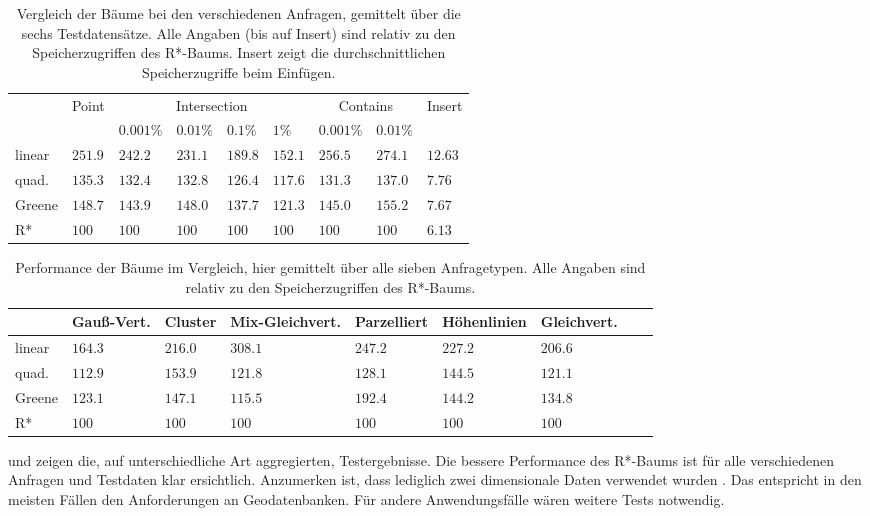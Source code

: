 \documentclass[runningheads,a4paper]{llncs}
\begin{document}
	\begin{table}
	\caption{Vergleich der Bäume bei den verschiedenen Anfragen, gemittelt über die sechs Testdatensätze. Alle Angaben (bis auf Insert) sind relativ zu den Speicherzugriffen des R*-Baums. Insert zeigt die durchschnittlichen Speicherzugriffe beim Einfügen.}
	\label{tab:benchmark-queries}
	\begin{tabularx}{\textwidth}{l|X|X|X|X|X|X|X|X}
		& Point & \multicolumn{4}{c|}{Intersection} & \multicolumn{2}{c|}{Contains} & Insert \\
		& & $0.001\%$ & $0.01\%$ & $0.1\%$ & $1\%$ & $0.001\%$ & $0.01\%$ & \\
		\hline \hline
		linear	& $251.9$ & $242.2$ & $231.1$ & $189.8$ & $152.1$ & $256.5$ & $274.1$ & $12.63$	\\ \hline
		quad.		&	$135.3$ & $132.4$ & $132.8$ & $126.4$ & $117.6$ & $131.3$ & $137.0$ & $7.76$	\\ \hline
		Greene	& $148.7$ & $143.9$ & $148.0$ & $137.7$ & $121.3$ & $145.0$ & $155.2$ & $7.67$	\\ \hline
		R*			& $100$		& $100$		& $100$		& $100$		& $100$		& $100$		& $100$		& $6.13$
	\end{tabularx}
	\end{table}

	\begin{table}
	\caption{Performance der Bäume im Vergleich, hier gemittelt über alle sieben Anfragetypen. Alle Angaben sind relativ zu den Speicherzugriffen des R*-Baums.}
	\label{tab:benchmark-data}
	\begin{tabularx}{\textwidth}{l|X|X|X|X|X|X|X|X}
		& Gauß-Vert. & Cluster & Mix-Gleichvert. & Parzelliert & Höhenlinien & Gleichvert. \\
		\hline \hline
		linear	& $164.3$ & $216.0$ & $308.1$ & $247.2$ & $227.2$ & $206.6$	\\ \hline
		quad.		&	$112.9$ & $153.9$ & $121.8$ & $128.1$ & $144.5$ & $121.1$	\\ \hline
		Greene	& $123.1$ & $147.1$ & $115.5$ & $192.4$ & $144.2$ & $134.8$	\\ \hline
		R*			& $100$		& $100$		& $100$		& $100$		& $100$		& $100$
	\end{tabularx}
	\end{table}

	 und  zeigen die, auf unterschiedliche Art aggregierten, Testergebnisse. Die bessere Performance des R*-Baums ist für alle verschiedenen Anfragen und Testdaten klar ersichtlich. Anzumerken ist, dass lediglich zwei dimensionale Daten verwendet wurden \citep[vgl.][328]{Beckmann:1990}. Das entspricht in den meisten Fällen den Anforderungen an Geodatenbanken. Für andere Anwendungsfälle wären weitere Tests notwendig.
\end{document}
